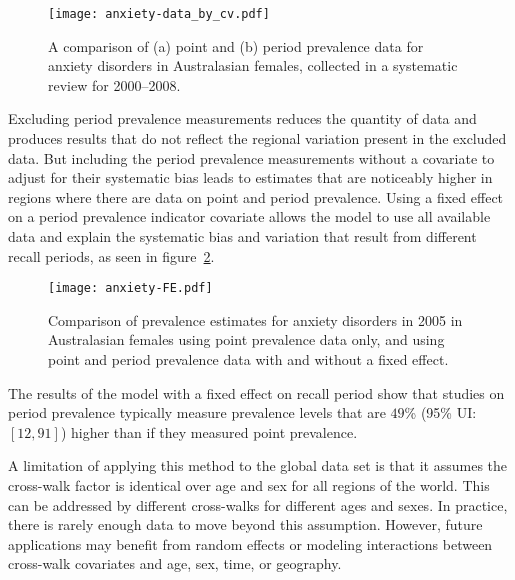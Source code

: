     \begin{figure}[h]
        \begin{center}
            \texttt{[image: anxiety-data\_by\_cv.pdf]}
            \caption[Systematic review data of anxiety disorders.]{A comparison of (a) point and (b) period prevalence data
              for anxiety disorders in Australasian females, collected in a systematic review for
              2000--2008.}
            \label{fig:app-anxiety data}
        \end{center}
    \end{figure}

Excluding period prevalence measurements reduces the quantity of data
and produces results that do not reflect the regional variation
present in the excluded data.  But including the period prevalence
measurements without a covariate to adjust for their systematic bias
leads to estimates that are noticeably higher in regions where there
are data on point and period prevalence.  Using a fixed effect on a
period prevalence indicator covariate allows the model to use all
available data and explain the systematic bias and variation that
result from different recall periods, as seen in
figure~\ref{fig:app-anxiety FE}.

    \begin{figure}[h]
        \begin{center}
            \texttt{[image: anxiety-FE.pdf]}
            \caption[Comparison of prevalence estimates of anxiety disorders
              using different methods.]{Comparison of prevalence estimates for anxiety
              disorders in 2005 in Australasian females using point
              prevalence data only, and using point and period prevalence data
              with and without a fixed effect.}
            \label{fig:app-anxiety FE}
        \end{center}
    \end{figure}

The results of the model with a fixed effect on recall period show
that studies on period prevalence typically measure prevalence levels
that are $49$\% (95\% UI: $[12, 91]$) higher than if they measured point
prevalence.

A limitation of applying this method to the global data set is that it
assumes the cross-walk factor is identical over age and sex for all regions of the
world.  This can be addressed by different cross-walks for different ages
and sexes.  In practice, there is rarely enough data to move beyond this
assumption.  However, future applications may benefit from random effects or modeling
interactions between cross-walk covariates and age, sex, time, or
geography.

